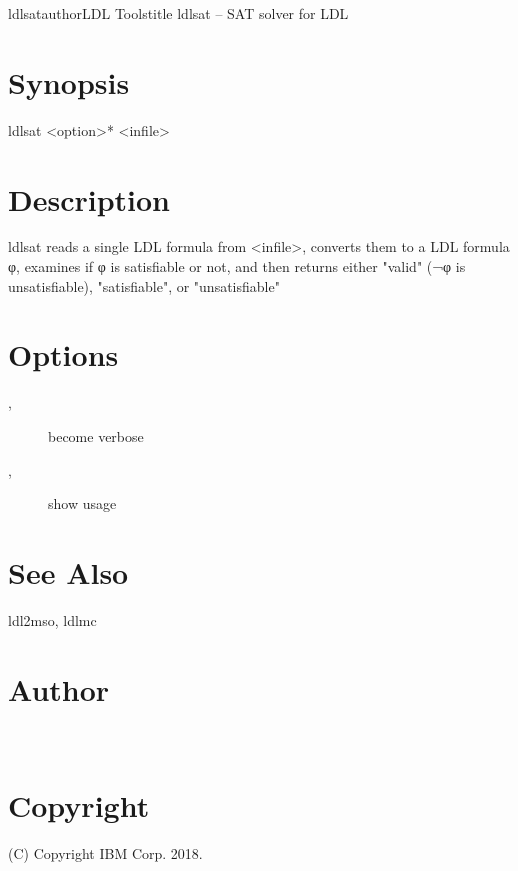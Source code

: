 \documentclass[fancy]{article}
\begin{document}
\begin{Name}{1}{ldlsat}{author}{LDL Tools}{title}
ldlsat -- SAT solver for LDL
\end{Name}

\section{Synopsis}
ldlsat <option>* <infile>

\section{Description}
ldlsat reads a single LDL formula from <infile>,
converts them to a LDL formula φ,
examines if φ is satisfiable or not, and then
returns either "valid" (¬φ is unsatisfiable), "satisfiable", or "unsatisfiable"

\section{Options}
\begin{description}
\item[, ]
become verbose
%
\item[, ]
show usage
\end{description}

\section{See Also}
ldl2mso, ldlmc

\section{Author}
\\

\section{Copyright}
(C) Copyright IBM Corp. 2018.
\end{document}

